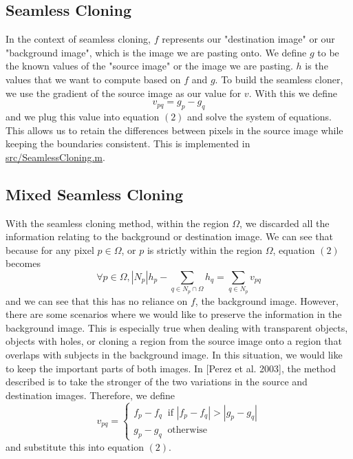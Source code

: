 \documentclass[12pt]{article}
\begin{document}
\subsection{Seamless Cloning}
In the context of seamless cloning, $f$ represents our "destination image" or our "background image", which is the image we are pasting onto. We define $g$ to be the known values of the "source image" or the image we are pasting. $h$ is the values that we want to compute based on $f$ and $g$. To build the seamless cloner, we use the gradient of the source image as our value for $v$. With this we define
\begin{equation}
v_{pq} = g_p-g_q
\end{equation}
and we plug this value into equation $(2)$ and solve the system of equations. This allows us to retain the differences between pixels in the source image while keeping the boundaries consistent. This is implemented in \url{src/SeamlessCloning.m}. 

\subsection{Mixed Seamless Cloning}
With the seamless cloning method, within the region $\Omega$, we discarded all the information relating to the background or destination image. We can see that because for any pixel $p\in \Omega$, or $p$ is strictly within the region $\Omega$, equation $(2)$ becomes
\begin{equation}
\forall p \in \Omega, |N_p|h_p - \sum_{q\in N_p \cap \Omega} h_q = \sum_{q\in N_p} v_{pq}
\end{equation}
and we can see that this has no reliance on $f$, the background image. However, there are some scenarios where we would like to preserve the information in the background image. This is especially true when dealing with transparent objects, objects with holes, or cloning a region from the source image onto a region that overlaps with subjects in the background image. In this situation, we would like to keep the important parts of both images. In [Perez et al. 2003], the method described is to take the stronger of the two variations in the source and destination images. Therefore, we define
\begin{equation}
v_{pq} = 
\begin{cases}
f_p-f_q \;\; \text{if }|f_p - f_q|>|g_p-g_q|\\
g_p-g_q \;\; \text{otherwise} 
\end{cases}
\end{equation} 
and substitute this into equation $(2)$. 
\end{document}
